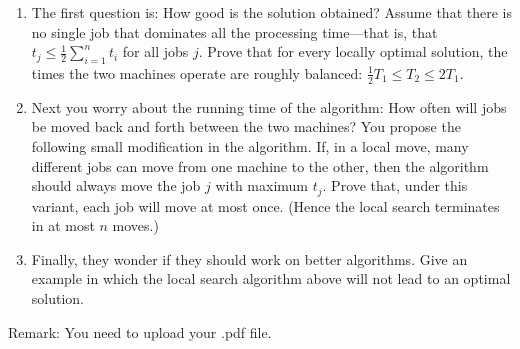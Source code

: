\documentclass{article}
\begin{document}
\begin{enumerate}
\begin{enumerate}
    \item The first question is: How good is the solution obtained? Assume that there is no single job that dominates all the processing time—that is, that $t_j \leqslant  \frac{1}{2} \sum_{i=1}^n t_i$ for all jobs $j$. Prove that for every locally  optimal solution, the times the two machines operate are roughly balanced: $\frac{1}{2}T_1 \leqslant T_2 \leqslant 2T_1$.
    \item Next you worry about the running time of the algorithm: How often will jobs be moved back and forth between the two machines? You propose the following small modification in the algorithm. If, in a local move, many different jobs can move from one machine to the other, then the algorithm should always move the job $j$ with maximum $t_j$. Prove that, under this variant, each job will move at most once. (Hence the local search terminates in at most $n$ moves.)
    \item Finally, they wonder if they should work on better algorithms. Give an example in which the local search algorithm above will not lead to an optimal solution.
\end{enumerate}

\end{enumerate}

Remark: You need to upload your .pdf file.
\end{document}
